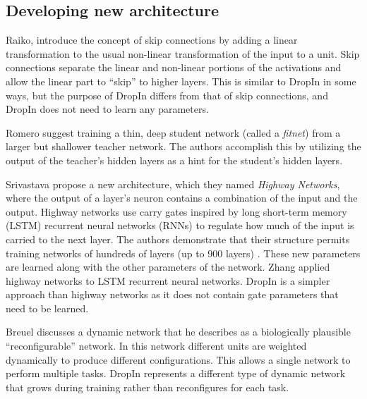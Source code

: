 \documentclass[10pt,twocolumn,letterpaper]{article}
\newcommand{\dropin}{DropIn }
\begin{document}
\subsection{Developing new architecture}

Raiko, \etal \cite{raiko2012deep} introduce the concept of skip connections by adding a linear transformation to the usual non-linear transformation of the input to a unit.  
Skip connections separate the linear and non-linear portions of the activations and allow the linear part to ``skip'' to higher layers.
This is similar to \dropin in some ways, but the purpose of \dropin differs from that of skip connections, and \dropin does not need to learn any parameters.

Romero \etal \cite{romero2014fitnets} suggest training a thin, deep student network (called a \textit{fitnet}) from a larger but shallower teacher network.  
The authors accomplish this by utilizing the output of the teacher's hidden layers as a hint for the student's hidden layers.

Srivastava \etal \cite{srivastava2015highway, srivastava2015training} propose a new architecture, which they named \textit{Highway Networks}, where the output of a layer's neuron contains a combination of the input and the output. 
Highway networks use carry gates inspired by long short-term memory (LSTM) recurrent neural networks (RNNs) to regulate how much of the input is carried to the next layer.  
The authors %
demonstrate that their structure permits training networks of hundreds of layers (up to 900 layers) \cite{srivastava2015highway, srivastava2015training}. 
These new parameters are learned along with the other parameters of the network.   
Zhang \etal \cite{Zhang2015highway} applied highway networks to LSTM recurrent neural networks.
\dropin is a simpler approach than highway networks as it does not contain gate parameters that need to be learned.

Breuel \cite{breuel2015possible} discusses a dynamic network that he describes as a biologically plausible ``reconfigurable'' network.
In this network different units are weighted dynamically to produce different configurations.  This allows a single network to perform multiple tasks.
\dropin represents a different type of dynamic network that grows during training rather than reconfigures for each task.
\end{document}
